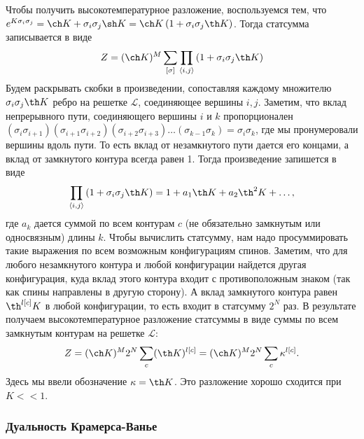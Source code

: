 \documentclass[a4paper,12pt]{article}
\theoremstyle{definition}
\theoremstyle{definition}
\theoremstyle{definition}
\begin{document}
Чтобы получить высокотемпературное разложение, воспользуемся тем, что $e^{K\sigma_i\sigma_j}=\ch
K+\sigma_i\sigma_j\sh K=\ch K \left(1+\sigma_i\sigma_j \th K\right)$. Тогда статсумма записывается в
виде 
\begin{equation}
  \label{eq:80}
  Z=(\ch K)^M\sum_{[\sigma]}\prod_{\left<i,j\right>}\left(1+\sigma_i \sigma_j \th K\right)
\end{equation}
Будем раскрывать скобки в произведении, сопоставляя каждому множителю $\sigma_i\sigma_j \th K$ ребро
на решетке $\mathcal{L}$, соединяющее вершины $i,j$. Заметим, что вклад непрерывного пути,
соединяющего вершины $i$ и $k$ пропорционален $(\sigma_i \sigma_{i+1}) (\sigma_{i+1}\sigma_{i+2})
(\sigma_{i+2}\sigma_{i+3})\dots (\sigma_{k-1}\sigma_k)=\sigma_{i}\sigma_k$, где мы пронумеровали
вершины вдоль пути. То есть вклад от незамкнутого пути дается его концами, а вклад от замкнутого
контура всегда равен 1.  Тогда произведение запишется в виде 
\begin{equation}
  \label{eq:107}
  \prod_{\left<i,j\right>}\left(1+\sigma_i \sigma_j \th K\right)=1+a_1 \th K +a_2 \th^2 K+\dots,
\end{equation}
где $a_k$ дается суммой по всем контурам $c$ (не обязательно замкнутым или односвязным) длины $k$. 
Чтобы вычислить статсумму, нам надо просуммировать такие выражения по всем возможным конфигурациям
спинов. Заметим, что для любого незамкнутого контура и любой конфигурации найдется другая
конфигурация, куда вклад этого контура входит с противоположным знаком (так как спины направлены в
другую сторону). А вклад замкнутого контура равен $\th^{l[c]}K$ в любой конфигурации, то есть входит
в статсумму $2^N$ раз. В результате получаем высокотемпературное разложение статсуммы в виде суммы
по всем замкнутым контурам на решетке $\mathcal{L}$: 
\begin{equation}
  \label{eq:108}
  Z=(\ch K)^M 2^N \sum_c (\th K)^{l[c]}=(\ch K)^M 2^N \sum_c \kappa^{l[c]}.
\end{equation}
Здесь мы ввели обозначение $\kappa=\th K$. Это разложение хорошо сходится при $K<<1$. 

\subsubsection{Дуальность Крамерса-Ванье}
\label{sec:duality}
\end{document}
